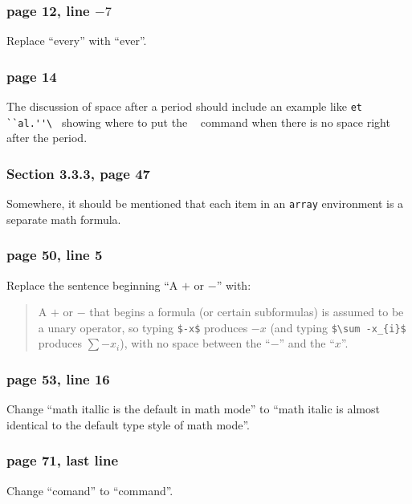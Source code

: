 \subsubsection*{page 12, line $-7$}
Replace ``every'' with ``ever''.

\subsubsection*{page 14}
{\sloppy
The discussion of space after a period should include an example
like \verb*|et ``al.''\ | showing where to put the \verb*| | command
when there is no space right after the period.\par}

\subsubsection*{Section 3.3.3, page 47}
Somewhere, it should be mentioned that each item in an {\tt array}
environment is a separate math formula.


\subsubsection*{page 50, line 5}
Replace the sentence beginning ``A $+$ or $-$'' with:
\begin{quotation}
A $+$ or $-$ that begins a formula (or certain subformulas) is assumed
to be a unary operator, so typing \verb|$-x$| produces $-x$ (and typing
\verb|$\sum -x_{i}$| produces $\sum -x_{i}$), with no space between the
``$-$'' and the ``$x$''.
\end{quotation}

\subsubsection*{page 53, line 16}
Change ``math itallic is the default in math mode'' to ``math italic is
almost identical to the default type style of math mode''.

\subsubsection*{page 71, last line}
Change ``comand'' to ``command''.

